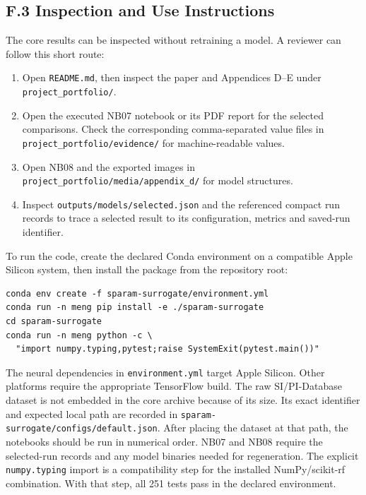 \clearpage
\PortfolioContentPageCommand
{}
{}
\subsection*{F.3 Inspection and Use Instructions}
\label{app:f-instructions}

The core results can be inspected without retraining a model. A reviewer can
follow this short route:

\begin{enumerate}
    \item Open \nolinkurl{README.md}, then inspect the paper and Appendices D--E
          under \nolinkurl{project_portfolio/}.
    \item Open the executed NB07 notebook or its PDF report for the selected
          comparisons. Check the corresponding comma-separated value files in
          \nolinkurl{project_portfolio/evidence/} for machine-readable values.
    \item Open NB08 and the exported images in
          \nolinkurl{project_portfolio/media/appendix_d/} for model structures.
    \item Inspect \nolinkurl{outputs/models/selected.json} and the referenced
          compact run records to trace a selected result to its configuration,
          metrics and saved-run identifier.
\end{enumerate}

To run the code, create the declared Conda environment on a compatible Apple
Silicon system, then install the package from the repository root:

\begin{verbatim}
conda env create -f sparam-surrogate/environment.yml
conda run -n meng pip install -e ./sparam-surrogate
cd sparam-surrogate
conda run -n meng python -c \
  "import numpy.typing,pytest;raise SystemExit(pytest.main())"
\end{verbatim}

The neural dependencies in \nolinkurl{environment.yml} target Apple Silicon.
Other platforms require the appropriate TensorFlow build. The raw
SI/PI-Database dataset is not embedded in the core archive because of its size.
Its exact identifier and expected local path are recorded in
\nolinkurl{sparam-surrogate/configs/default.json}. After placing the dataset at
that path, the notebooks should be run in numerical order. NB07 and NB08 require
the selected-run records and any model binaries needed for regeneration.
The explicit \nolinkurl{numpy.typing} import is a compatibility step for the
installed NumPy/scikit-rf combination. With that step, all 251 tests pass in the
declared environment.

